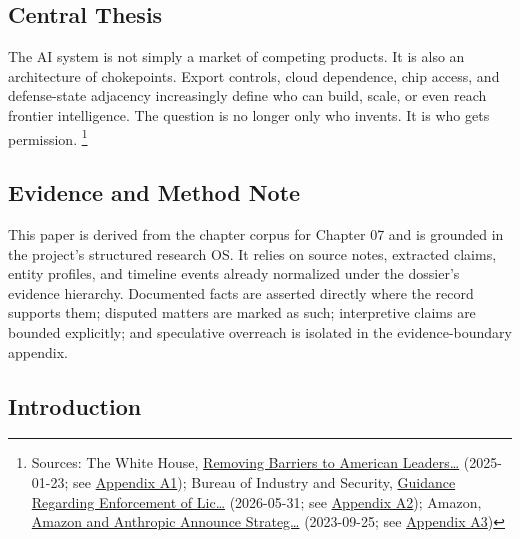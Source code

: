 \documentclass[
  american,
  11pt,
  letterpaper,
]{article}
\begin{document}
\subsection{Central Thesis}\label{central-thesis}

The AI system is not simply a market of competing products. It is also
an architecture of chokepoints. Export controls, cloud dependence, chip
access, and defense-state adjacency increasingly define who can build,
scale, or even reach frontier intelligence. The question is no longer
only who invents. It is who gets permission. \footnote{Sources: The
  White House,
  \href{https://www.whitehouse.gov/presidential-actions/2025/01/removing-barriers-to-american-leadership-in-artificial-intelligence/}{Removing
  Barriers to American Leaders\ldots{}} (2025-01-23; see
  \hyperref[appendix-a1-removing-barriers-to-american-leadership-in-artificial-intelligence]{Appendix
  A1}); Bureau of Industry and Security,
  \href{https://www.bis.gov/media/documents/bis-guidance-may-31-2026.pdf}{Guidance
  Regarding Enforcement of Lic\ldots{}} (2026-05-31; see
  \hyperref[appendix-a2-guidance-regarding-enforcement-of-license-requirements-for-advanced-computing-items-for-entities-headquartered-in-country-group-d-5-and-macau]{Appendix
  A2}); Amazon,
  \href{https://press.aboutamazon.com/2023/9/amazon-and-anthropic-announce-strategic-collaboration-to-advance-generative-ai}{Amazon
  and Anthropic Announce Strateg\ldots{}} (2023-09-25; see
  \hyperref[appendix-a3-amazon-and-anthropic-announce-strategic-collaboration-to-advance-generative-ai]{Appendix
  A3})}

\subsection{Evidence and Method Note}\label{evidence-and-method-note}

This paper is derived from the chapter corpus for Chapter 07 and is
grounded in the project's structured research OS. It relies on source
notes, extracted claims, entity profiles, and timeline events already
normalized under the dossier's evidence hierarchy. Documented facts are
asserted directly where the record supports them; disputed matters are
marked as such; interpretive claims are bounded explicitly; and
speculative overreach is isolated in the evidence-boundary appendix.

\subsection{Introduction}\label{introduction}
\end{document}
